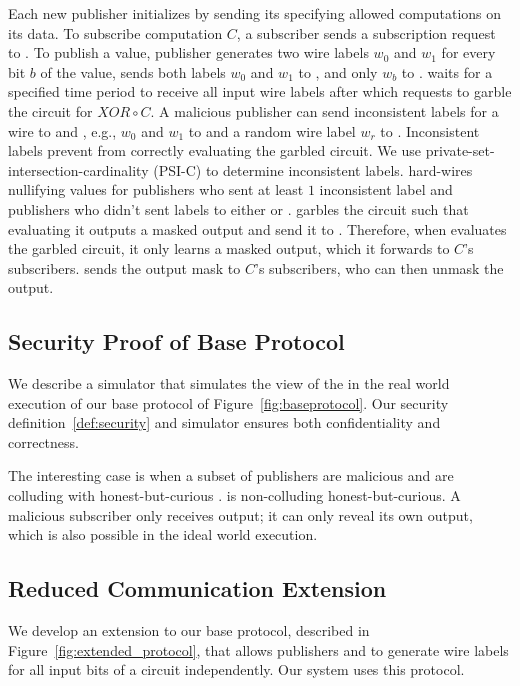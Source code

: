 Each new publisher initializes by sending its \policy specifying allowed
computations on its data. To subscribe computation $C$, a subscriber sends a
subscription request to \broker.  To publish a value, publisher generates two
wire labels $w_0$ and $w_1$ for every bit $b$ of the value, sends both labels
$w_0$ and $w_1$ to \garbler, and only $w_b$ to \broker. \broker waits for a
specified time period to receive all input wire labels after which \broker
requests \garbler to garble the circuit for $XOR \circ C$.  A malicious
publisher can send inconsistent labels for a wire to \broker and \garbler,
e.g., $w_0$ and $w_1$ to \garbler and a random wire label $w_r$ to \broker.
Inconsistent labels prevent \garbler from correctly evaluating the garbled
circuit. We use private-set-intersection-cardinality (PSI-C) to determine
inconsistent labels. \garbler hard-wires nullifying values for publishers who
sent at least $1$ inconsistent label and publishers who didn't sent labels to
either \broker or \garbler. \garbler garbles the circuit such that evaluating
it outputs a masked output and send it to \broker.  Therefore, when \broker
evaluates the garbled circuit, it only learns a masked output, which it
forwards to $C$'s subscribers. \garbler sends the output mask to $C$'s
subscribers, who can then unmask the output.

\subsection{Security Proof of Base Protocol}
We describe a simulator \Sim that simulates the view of the \Adv in the real
world execution of our base protocol of Figure~\ref{fig:baseprotocol}. Our
security definition~\ref{def:security} and simulator \Sim ensures both
confidentiality and correctness.

The interesting case is when a subset of publishers are malicious and are
colluding with honest-but-curious \broker. \garbler is non-colluding
honest-but-curious. A malicious subscriber only receives output; it can only
reveal its own output, which is also possible in the ideal world execution.\\[6pt]


\subsection{Reduced Communication Extension}


We develop an extension to our base protocol, described in
Figure~\ref{fig:extended_protocol}, that allows publishers and \garbler to
generate wire labels for all input bits of a circuit independently.  Our system
uses this protocol.

